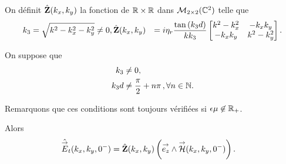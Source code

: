         \begin{defn}
          \label{def:plan:impedance:1c}
          On définit \(\hat {\mathbf{Z}}(k_x,k_y)\) la fonction de \(\mathbb R \times \mathbb R\) dans \(\mathcal{M}_{2\times2}(\mathbb C^2)\) telle que
          \begin{align*}
            k_3 &= \sqrt{k^2 - k_x^2 -k_y^2} \not = 0,
            \hat {\mathbf{Z}}(k_x,k_y) &= i\eta_r\dfrac{\tan\left(k_3d\right)}{k k_3}
            \begin{bmatrix}
              k^2-k_x^2  & -k_xk_y
              \\
              -k_xk_y & k^2-k_y^2
            \end{bmatrix}.
          \end{align*}
        \end{defn}
        \begin{prop}
            \label{prop:imp_plan:symb_z:1c}
            On suppose que
            \begin{align*}
                k_3     & \not = 0, \\
                k_3d    & \not = \dfrac{\pi}{2}+n\pi\,, \forall n \in \mathbb N.
            \end{align*}
            \begin{REM}
              Remarquons que ces conditions sont toujours vérifiées si \(\epsilon\mu\not\in\mathbb R_+\).
            \end{REM}
            Alors
            \begin{align*}
              \hat {{\overset{\rightarrow}{E}}}_t(k_x,k_y,0^-) &= \hat {\mathbf{Z}}(k_x,k_y) \left({\overset{\rightarrow}{e_z}} \wedge {\overset{\rightarrow}{\mathcal{H}}}(k_x,k_y,0^-)\right).
            \end{align*}
        \end{prop}

